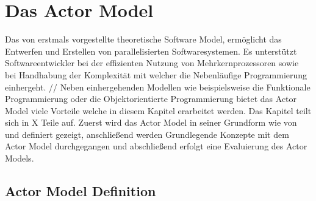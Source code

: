 \chapter{Das Actor Model}
Das von \cite{hewitt1973session} erstmals vorgestellte theoretische Software Model, ermöglicht das Entwerfen und Erstellen von parallelisierten Softwaresystemen. Es unterstützt Softwareentwickler bei der effizienten Nutzung von Mehrkernprozessoren sowie bei Handhabung der  Komplexität mit welcher die Nebenläufige Programmierung einhergeht.   //
Neben einhergehenden Modellen wie beispielsweise die Funktionale Programmierung oder die Objektorientierte Programmierung bietet das Actor Model viele Vorteile welche in diesem Kapitel erarbeitet werden.  Das Kapitel teilt sich in X Teile auf. Zuerst wird das Actor Model in seiner Grundform wie von \cite{hewitt1973session} und \cite{Agha1985ActorsSystems} definiert gezeigt, anschließend werden Grundlegende Konzepte mit dem Actor Model durchgegangen und abschließend erfolgt eine Evaluierung des Actor Models.

\section{Actor Model Definition}


